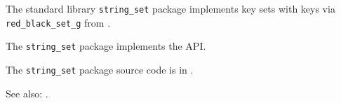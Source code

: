 
The standard library {\tt string\_set} package implements key sets with  
keys via {\tt red\_black\_set\_g} from  
.

The {\tt string\_set} package implements the  API.

The {\tt string\_set} package source code is in .

See also:  .




